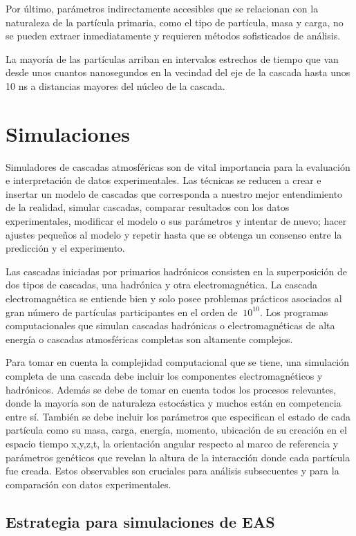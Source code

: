 Por último, parámetros indirectamente accesibles que se relacionan con la naturaleza de la partícula primaria, como el tipo de partícula, masa y carga, no se pueden extraer inmediatamente y requieren métodos sofisticados de análisis. 

La mayoría de las partículas arriban en intervalos estrechos de tiempo que van desde unos cuantos nanosegundos en la vecindad del eje de la cascada hasta unos 10 ns a distancias mayores del núcleo de la cascada.

\section{Simulaciones}

Simuladores de cascadas atmosféricas son de vital importancia para la evaluación e interpretación de datos experimentales. Las técnicas se reducen a crear e insertar un modelo de cascadas que corresponda a nuestro mejor entendimiento de la realidad, simular cascadas, comparar resultados con los datos experimentales, modificar el modelo o sus parámetros y intentar de nuevo; hacer ajustes pequeños al modelo y repetir hasta que se obtenga un consenso entre la predicción y el experimento.

Las cascadas iniciadas por primarios hadrónicos consisten en la superposición de dos tipos de cascadas, una hadrónica y otra electromagnética. La cascada electromagnética se entiende bien y solo posee problemas prácticos asociados al gran número de partículas participantes en el orden de $~10^10$. Los programas computacionales que simulan cascadas hadrónicas o electromagnéticas de alta energía o cascadas atmosféricas completas son altamente complejos.

Para tomar en cuenta la complejidad computacional que se tiene, una simulación completa de una cascada debe incluir los componentes electromagnéticos y hadrónicos. Además se debe de tomar en cuenta todos los procesos relevantes, donde la mayoría son de naturaleza estocástica y muchos están en competencia entre sí. También se debe incluir los parámetros que especifican el estado de cada partícula como su masa, carga, energía, momento, ubicación de su creación en el espacio tiempo x,y,z,t, la orientación angular respecto al marco de referencia y parámetros genéticos que revelan la altura de la interacción donde cada partícula fue creada. Estos observables son cruciales para análisis subsecuentes y para la comparación con datos experimentales.

\subsection{Estrategia para simulaciones de EAS}

